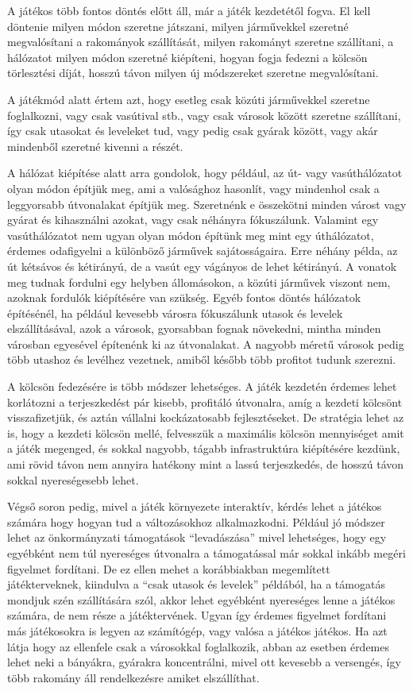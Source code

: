 
A játékos több fontos döntés előtt áll, már a játék kezdetétől fogva. El kell döntenie milyen módon szeretne játszani, milyen járművekkel szeretné megvalósítani a rakományok szállítását, milyen rakományt szeretne szállítani, a hálózatot milyen módon szeretné kiépíteni, hogyan fogja fedezni a kölcsön törlesztési díját, hosszú távon milyen új módszereket szeretne megvalósítani.

A játékmód alatt értem azt, hogy esetleg csak közúti járművekkel szeretne foglalkozni, vagy csak vasútival stb., vagy csak városok között szeretne szállítani, így csak utasokat és leveleket tud, vagy pedig csak gyárak között, vagy akár mindenből szeretné kivenni a részét.

A hálózat kiépítése alatt arra gondolok, hogy például, az út- vagy vasúthálózatot olyan módon építjük meg, ami a valósághoz hasonlít, vagy mindenhol csak a leggyorsabb útvonalakat építjük meg. Szeretnénk e összekötni minden várost vagy gyárat és kihasználni azokat, vagy csak néhányra fókuszálunk. Valamint egy vasúthálózatot nem ugyan olyan módon építünk meg mint egy úthálózatot, érdemes odafigyelni a különböző járművek sajátosságaira. Erre néhány példa, az út kétsávos és kétirányú, de a vasút egy vágányos de lehet kétirányú. A vonatok meg tudnak fordulni egy helyben állomásokon, a közúti járművek viszont nem, azoknak fordulók kiépítésére van szükség. Egyéb fontos döntés hálózatok építésénél, ha például kevesebb városra fókuszálunk utasok és levelek elszállításával, azok a városok, gyorsabban fognak növekedni, mintha minden városban egyesével építenénk ki az útvonalakat. A nagyobb méretű városok pedig több utashoz és levélhez vezetnek, amiből később több profitot tudunk szerezni.

A kölcsön fedezésére is több módszer lehetséges. A játék kezdetén érdemes lehet korlátozni a terjeszkedést pár kisebb, profitáló útvonalra, amíg a kezdeti kölcsönt visszafizetjük, és aztán vállalni kockázatosabb fejlesztéseket. De stratégia lehet az is, hogy a kezdeti kölcsön mellé, felvesszük a maximális kölcsön mennyiséget amit a játék megenged, és sokkal nagyobb, tágabb infrastruktúra kiépítésére kezdünk, ami rövid távon nem annyira hatékony mint a lassú terjeszkedés, de hosszú távon sokkal nyereségesebb lehet.

Végső soron pedig, mivel a játék környezete interaktív, kérdés lehet a játékos számára hogy hogyan tud a változásokhoz alkalmazkodni. Például jó módszer lehet az önkormányzati támogatások “levadászása” mivel lehetséges, hogy egy egyébként nem túl nyereséges útvonalra a támogatással már sokkal inkább megéri figyelmet fordítani. De ez ellen mehet a korábbiakban megemlített játékterveknek, kiindulva a “csak utasok és levelek” példából, ha a támogatás mondjuk szén szállítására szól, akkor lehet egyébként nyereséges lenne a játékos számára, de nem része a játéktervének. Ugyan így érdemes figyelmet fordítani más játékosokra is legyen az számítógép, vagy valósa a játékos játékos. Ha azt látja hogy az ellenfele csak a városokkal foglalkozik, abban az esetben érdemes lehet neki a bányákra, gyárakra koncentrálni, mivel ott kevesebb a versengés, így több rakomány áll rendelkezésre amiket elszállíthat.

